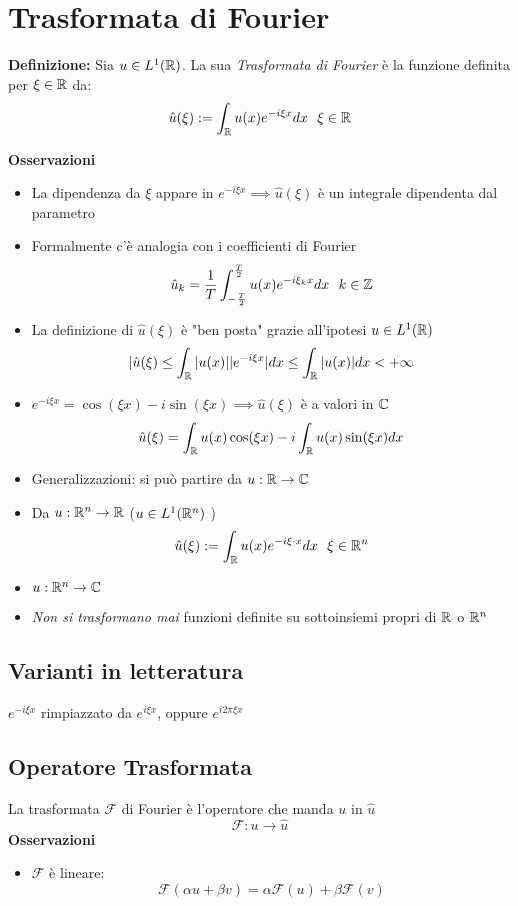 
\section{Trasformata di Fourier}
\begin{tcolorbox}
	\textbf{Definizione: }Sia $u\in L^{1}(\mathbb{R})$. La sua \emph{Trasformata di Fourier} è la funzione definita per $\xi \in \mathbb{R}$ da:
	\[\hat{u}(\xi):=\int_{\R}^{} u(x)e^{-i\xi x}dx\ \ \xi \in \R\]

\end{tcolorbox}
\textbf{Osservazioni} 
\begin{itemize}
	\item La dipendenza da $\xi$ appare in $e^{-i\xi x}\implies \hat{u}(\xi)$ è un integrale dipendenta dal parametro
	\item Formalmente c'è analogia con i coefficienti di Fourier
		\[\hat{u}_k=\frac{1}{T}\int_{-\frac{T}{2}}^{\frac{T}{2}} u(x)e^{-i\xi_k x}dx\ \ k\in \mathbb{Z}\]
	\item La definizione di $\hat{u}(\xi)$ è "ben posta" grazie all'ipotesi $u\in L^{1}(\mathbb{R})$ 
		\[|\hat{u}(\xi)\le \int_{\mathbb{R}}^{} |u(x) | |e^{-i\xi x}|dx\le \int_{\mathbb{R}}^{} |u(x)|dx<+\infty\]
	\item $e^{-i\xi x}=\cos(\xi x)-i\sin(\xi x)\implies \hat{u}(\xi)$ è a valori in $\mathbb{C}$ 
		\[\hat{u}(\xi)=\int_{\mathbb{R}}^{} u(x)\cos(\xi x)-i \int_{\mathbb{R}}^{} u(x) \sin(\xi x)dx\]  
	\item Generalizzazioni: si può partire da $u:\mathbb{R}\to \mathbb{C}$
	\item Da $u:\mathbb{R}^n\to \mathbb{R}$ ($u\in L^{1}(\mathbb{R}^n)$ )
		\[\hat{u}(\xi):=\int_{\mathbb{R}}^{} u(x)e^{-i\xi\cdot x}dx\ \ \xi \in \mathbb{R}^n\]
	\item $u:\mathbb{R}^n\to \mathbb{C}$ 
	\item \emph{Non si trasformano mai} funzioni definite su sottoinsiemi propri di $\mathbb{R}$ o $\mathbb{R}^n$
\end{itemize}
\subsection{Varianti in letteratura}
$e^{-i\xi x}$ rimpiazzato da $e^{i\xi x}$, oppure $e^{i 2\pi\xi x}$
\subsection{Operatore Trasformata}
La trasformata $\mathcal F$ di Fourier è l'operatore che manda $u$ in $\hat{ u}$ 
\[\mathcal F:u\to \hat{u}\]
\textbf{Osservazioni} 
\begin{itemize}
	\item $\mathcal F$ è lineare:
		\[\mathcal F(\alpha u+\beta v)=\alpha\mathcal F(u)+\beta\mathcal F(v)\]
\end{itemize}
